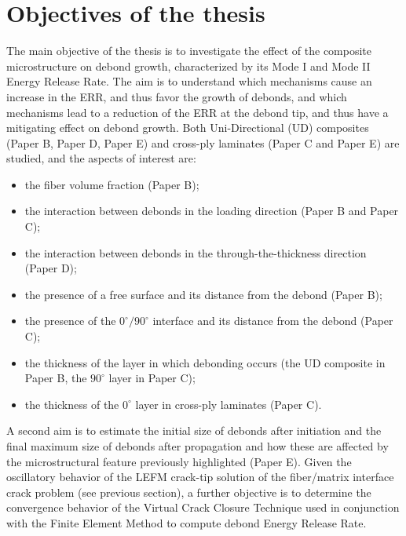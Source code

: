 \section{Objectives of the thesis}

The main objective of the thesis is to investigate the effect of the composite microstructure on debond growth, characterized by its Mode I and Mode II Energy Release Rate. The aim is to understand which mechanisms cause an increase in the ERR, and thus favor the growth of debonds, and which mechanisms lead to a reduction of the ERR at the debond tip, and thus have a mitigating effect on debond growth. Both Uni-Directional (UD) composites (Paper B, Paper D, Paper E) and cross-ply laminates (Paper C and Paper E) are studied, and the aspects of interest are:

\begin{itemize}
\item the fiber volume fraction (Paper B);
\item the interaction between debonds in the loading direction (Paper B and Paper C);
\item the interaction between debonds in the through-the-thickness direction (Paper D);
\item the presence of a free surface and its distance from the debond (Paper B);
\item the presence of the $0^{\circ}/90^{\circ}$ interface and its distance from the debond (Paper C);
\item the thickness of the layer in which debonding occurs (the UD composite in Paper B, the $90^{\circ}$ layer in Paper C);
\item the thickness of the $0^{\circ}$ layer in cross-ply laminates (Paper C).
\end{itemize}

A second aim is to estimate the initial size of debonds after initiation and the final maximum size of debonds after propagation and how these are affected by the microstructural feature previously highlighted (Paper E). Given the oscillatory behavior of the LEFM crack-tip solution of the fiber/matrix interface crack problem (see previous section), a further objective is to determine the convergence behavior of the Virtual Crack Closure Technique used in conjunction with the Finite Element Method to compute debond Energy Release Rate.
